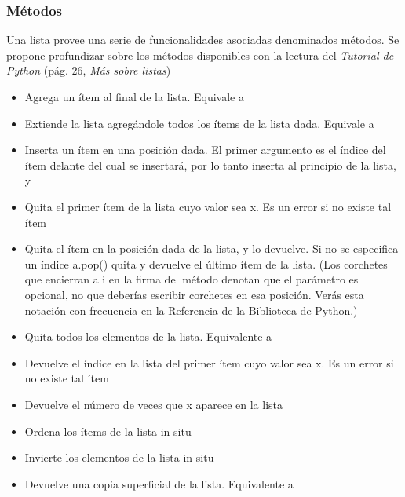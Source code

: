 \documentclass[a4paper,12pt,spanish]{sphinxmanual}
\begin{document}
\subsubsection{Métodos}
\label{Unidad03:metodos}
Una lista provee una serie de funcionalidades asociadas denominados
métodos. Se propone profundizar sobre los métodos disponibles con la
lectura del \emph{Tutorial de Python} (pág. 26, \emph{Más sobre listas})
\begin{itemize}
\item {} 
 Agrega un ítem al final de la lista. Equivale a

\item {} 
 Extiende la lista agregándole todos los ítems de
la lista dada. Equivale a 

\item {} 
 Inserta un ítem en una posición dada. El primer
argumento es el índice del ítem delante del cual se insertará, por lo
tanto  inserta al principio de la lista, y
 

\item {} 
 Quita el primer ítem de la lista cuyo valor sea x.
Es un error si no existe tal ítem

\item {} 
 Quita el ítem en la posición dada de la lista, y
lo devuelve. Si no se especifica un índice a.pop() quita y devuelve
el último ítem de la lista. (Los corchetes que encierran a i en la
firma del método denotan que el parámetro es opcional, no que
deberías escribir corchetes en esa posición. Verás esta notación con
frecuencia en la Referencia de la Biblioteca de Python.)

\item {} 
 Quita todos los elementos de la lista. Equivalente a

\item {} 
 Devuelve el índice en la lista del primer ítem cuyo
valor sea x. Es un error si no existe tal ítem

\item {} 
 Devuelve el número de veces que x aparece en la
lista

\item {} 
 Ordena los ítems de la lista in situ

\item {} 
 Invierte los elementos de la lista in situ

\item {} 
 Devuelve una copia superficial de la lista.
Equivalente a 

\end{itemize}
\end{document}
